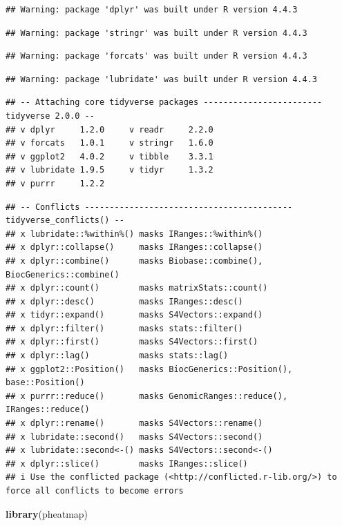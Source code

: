 \documentclass[
]{article}
\newenvironment{Shaded}{\begin{snugshade}}{\end{snugshade}}
\newcommand{\FunctionTok}[1]{\textcolor[rgb]{0.13,0.29,0.53}{\textbf{#1}}}
\newcommand{\NormalTok}[1]{#1}
\begin{document}
\begin{verbatim}
## Warning: package 'dplyr' was built under R version 4.4.3
\end{verbatim}

\begin{verbatim}
## Warning: package 'stringr' was built under R version 4.4.3
\end{verbatim}

\begin{verbatim}
## Warning: package 'forcats' was built under R version 4.4.3
\end{verbatim}

\begin{verbatim}
## Warning: package 'lubridate' was built under R version 4.4.3
\end{verbatim}

\begin{verbatim}
## -- Attaching core tidyverse packages ------------------------ tidyverse 2.0.0 --
## v dplyr     1.2.0     v readr     2.2.0
## v forcats   1.0.1     v stringr   1.6.0
## v ggplot2   4.0.2     v tibble    3.3.1
## v lubridate 1.9.5     v tidyr     1.3.2
## v purrr     1.2.2
\end{verbatim}

\begin{verbatim}
## -- Conflicts ------------------------------------------ tidyverse_conflicts() --
## x lubridate::%within%() masks IRanges::%within%()
## x dplyr::collapse()     masks IRanges::collapse()
## x dplyr::combine()      masks Biobase::combine(), BiocGenerics::combine()
## x dplyr::count()        masks matrixStats::count()
## x dplyr::desc()         masks IRanges::desc()
## x tidyr::expand()       masks S4Vectors::expand()
## x dplyr::filter()       masks stats::filter()
## x dplyr::first()        masks S4Vectors::first()
## x dplyr::lag()          masks stats::lag()
## x ggplot2::Position()   masks BiocGenerics::Position(), base::Position()
## x purrr::reduce()       masks GenomicRanges::reduce(), IRanges::reduce()
## x dplyr::rename()       masks S4Vectors::rename()
## x lubridate::second()   masks S4Vectors::second()
## x lubridate::second<-() masks S4Vectors::second<-()
## x dplyr::slice()        masks IRanges::slice()
## i Use the conflicted package (<http://conflicted.r-lib.org/>) to force all conflicts to become errors
\end{verbatim}

\begin{Shaded}
\begin{Highlighting}[]
\FunctionTok{library}\NormalTok{(pheatmap)}
\end{Highlighting}
\end{Shaded}
\end{document}
